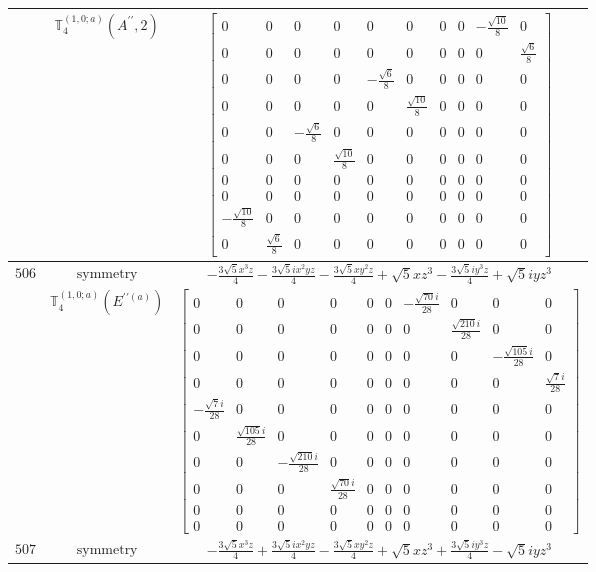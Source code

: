 \documentclass[fleqn,8pt,landscape]{jsarticle}
\begin{document}
\begin{longtable}{ccc}
$  $ & $ \mathbb{T}_{4}^{(1,0;a)}(A^{\prime\prime},2) $ & $ \begin{bmatrix} 0 & 0 & 0 & 0 & 0 & 0 & 0 & 0 & - \frac{\sqrt{10}}{8} & 0 \\ 0 & 0 & 0 & 0 & 0 & 0 & 0 & 0 & 0 & \frac{\sqrt{6}}{8} \\ 0 & 0 & 0 & 0 & - \frac{\sqrt{6}}{8} & 0 & 0 & 0 & 0 & 0 \\ 0 & 0 & 0 & 0 & 0 & \frac{\sqrt{10}}{8} & 0 & 0 & 0 & 0 \\ 0 & 0 & - \frac{\sqrt{6}}{8} & 0 & 0 & 0 & 0 & 0 & 0 & 0 \\ 0 & 0 & 0 & \frac{\sqrt{10}}{8} & 0 & 0 & 0 & 0 & 0 & 0 \\ 0 & 0 & 0 & 0 & 0 & 0 & 0 & 0 & 0 & 0 \\ 0 & 0 & 0 & 0 & 0 & 0 & 0 & 0 & 0 & 0 \\ - \frac{\sqrt{10}}{8} & 0 & 0 & 0 & 0 & 0 & 0 & 0 & 0 & 0 \\ 0 & \frac{\sqrt{6}}{8} & 0 & 0 & 0 & 0 & 0 & 0 & 0 & 0 \end{bmatrix} $ \\ \hline
$ 506 $ & $ \text{symmetry} $ & $ - \frac{3 \sqrt{5} x^{3} z}{4} - \frac{3 \sqrt{5} i x^{2} y z}{4} - \frac{3 \sqrt{5} x y^{2} z}{4} + \sqrt{5} x z^{3} - \frac{3 \sqrt{5} i y^{3} z}{4} + \sqrt{5} i y z^{3} $ \\
$  $ & $ \mathbb{T}_{4}^{(1,0;a)}(E^{\prime\prime(a)}) $ & $ \begin{bmatrix} 0 & 0 & 0 & 0 & 0 & 0 & - \frac{\sqrt{70} i}{28} & 0 & 0 & 0 \\ 0 & 0 & 0 & 0 & 0 & 0 & 0 & \frac{\sqrt{210} i}{28} & 0 & 0 \\ 0 & 0 & 0 & 0 & 0 & 0 & 0 & 0 & - \frac{\sqrt{105} i}{28} & 0 \\ 0 & 0 & 0 & 0 & 0 & 0 & 0 & 0 & 0 & \frac{\sqrt{7} i}{28} \\ - \frac{\sqrt{7} i}{28} & 0 & 0 & 0 & 0 & 0 & 0 & 0 & 0 & 0 \\ 0 & \frac{\sqrt{105} i}{28} & 0 & 0 & 0 & 0 & 0 & 0 & 0 & 0 \\ 0 & 0 & - \frac{\sqrt{210} i}{28} & 0 & 0 & 0 & 0 & 0 & 0 & 0 \\ 0 & 0 & 0 & \frac{\sqrt{70} i}{28} & 0 & 0 & 0 & 0 & 0 & 0 \\ 0 & 0 & 0 & 0 & 0 & 0 & 0 & 0 & 0 & 0 \\ 0 & 0 & 0 & 0 & 0 & 0 & 0 & 0 & 0 & 0 \end{bmatrix} $ \\ \hline
$ 507 $ & $ \text{symmetry} $ & $ - \frac{3 \sqrt{5} x^{3} z}{4} + \frac{3 \sqrt{5} i x^{2} y z}{4} - \frac{3 \sqrt{5} x y^{2} z}{4} + \sqrt{5} x z^{3} + \frac{3 \sqrt{5} i y^{3} z}{4} - \sqrt{5} i y z^{3} $ \\

\end{longtable}
\end{document}
